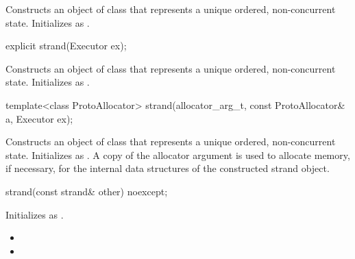 \begin{itemdescr}
\pnum
\effects Constructs an object of class  that represents a unique ordered, non-concurrent state. Initializes  as .

\pnum
{}

\end{itemdescr}

\begin{itemdecl}
explicit strand(Executor ex);
\end{itemdecl}

\begin{itemdescr}
\pnum
\effects Constructs an object of class  that represents a unique ordered, non-concurrent state. Initializes  as .
\end{itemdescr}

\begin{itemdecl}
template<class ProtoAllocator>
  strand(allocator_arg_t, const ProtoAllocator& a, Executor ex);
\end{itemdecl}

\begin{itemdescr}
\pnum
\effects Constructs an object of class  that represents a unique ordered, non-concurrent state. Initializes  as . A copy of the allocator argument  is used to allocate memory, if necessary, for the internal data structures of the constructed strand object.
\end{itemdescr}

\begin{itemdecl}
strand(const strand& other) noexcept;
\end{itemdecl}

\begin{itemdescr}
\pnum
\effects Initializes  as .

\pnum
\postconditions
\begin{itemize}
\item
{}
\item
{}
\end{itemize}
\end{itemdescr}


